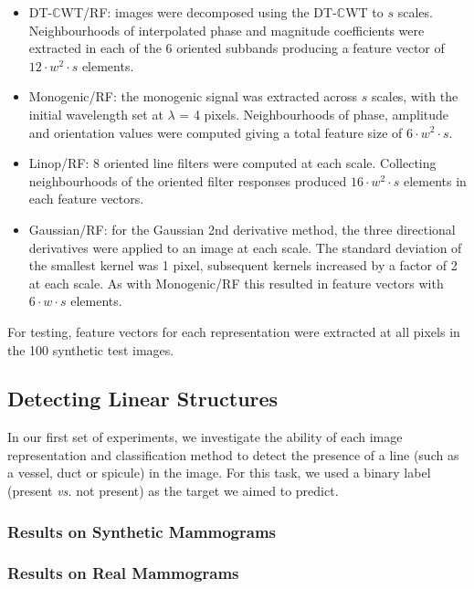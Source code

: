 \documentclass{IEEEtran}
\def\vs{\emph{vs.}}
\def\dtcwt{DT-$\mathbb{C}$WT}
\begin{document}
\begin{itemize}
\item	\dtcwt{}/RF: images were decomposed using the \dtcwt{} to $s$ scales. Neighbourhoods of interpolated phase and magnitude coefficients were extracted in each of the 6 oriented subbands producing a feature vector of $12 \cdot w^2 \cdot s$ elements.

\item	Monogenic/RF: the monogenic signal was extracted across $s$ scales, with the initial wavelength set at $\lambda$ = 4 pixels. Neighbourhoods of phase, amplitude and orientation values were computed giving a total feature size of $6 \cdot w^2 \cdot s$. 

\item	Linop/RF: 8 oriented line filters were computed at each scale. Collecting neighbourhoods of the oriented filter responses produced $16 \cdot w^2 \cdot s$ elements in each feature vectors.

\item	Gaussian/RF: for the Gaussian 2nd derivative method, the three directional derivatives were applied to an image at each scale. The standard deviation of the smallest kernel was 1 pixel, subsequent kernels increased by a factor of 2 at each scale. As with Monogenic/RF this resulted in feature vectors with $6 \cdot w \cdot s$ elements.
\end{itemize}

For testing, feature vectors for each representation were extracted at all pixels in the 100 synthetic test images.


\subsection{Detecting Linear Structures}
In our first set of experiments, we investigate the ability of each image representation and classification method to detect the presence of a line (such as a vessel, duct or spicule) in the image. For this task, we used a binary label (present \vs{} not present) as the target we aimed to predict.

\subsubsection{Results on Synthetic Mammograms}

\subsubsection{Results on Real Mammograms}
\end{document}
